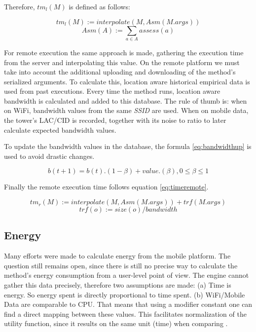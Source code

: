 \documentclass[10pt, conference, letterpaper]{IEEEtran}
\begin{document}
  Therefore, $tm_{l}(M)$ is defined as follows:

  \begin{equation} \label{eq:timelocal}
    tm_{l}(M) := interpolate(M, Asm(M.args))
  \end{equation}
  \begin{equation}
    Asm(A) := \sum_{a \in A} assess(a)
  \end{equation}

  For remote execution the same approach is made, gathering the execution time from the server and interpolating this value. On the remote platform we must take into account the additional uploading and downloading of the method's serialized arguments. To calculate this, location aware historical empirical data is used from past executions. Every time the method runs, location aware bandwidth is calculated and added to this database. The rule of thumb is: when on WiFi, bandwidth values from the same \textit{SSID} are used. When on mobile data, the tower's LAC/CID is recorded, together with its noise to ratio to later calculate expected bandwidth values.

  To update the bandwidth values in the database, the formula \ref{eq:bandwidthup} is used to avoid drastic changes.

  \begin{equation} \label{eq:bandwidthup}
    b(t+1) = b(t) . (1-\beta) + value . (\beta), 0 \leq \beta \leq 1
  \end{equation}

  Finally the remote execution time follows equation \ref{eq:timeremote}.

  \begin{equation} \label{eq:timeremote}
    tm_{r}(M) := interpolate(M, Asm(M.args)) + trf(M.args)
  \end{equation}
  \begin{equation}
    trf(o) := size(o) / bandwidth
  \end{equation}

  \subsection{Energy} \label{sec:energy}

  Many efforts were made to calculate energy from the mobile platform. The question still remains open, since there is still no precise way to calculate the method's energy consumption from a user-level point of view. The engine cannot gather this data precisely, therefore two assumptions are made: (a) Time is energy. So energy spent is directly proportional to time spent. (b) WiFi/Mobile Data are comparable to CPU. That means that using a modifier constant one can find a direct mapping between these values. This facilitates normalization of the utility function, since it results on the same unit (time) when comparing \cite{6606420}.
\end{document}
